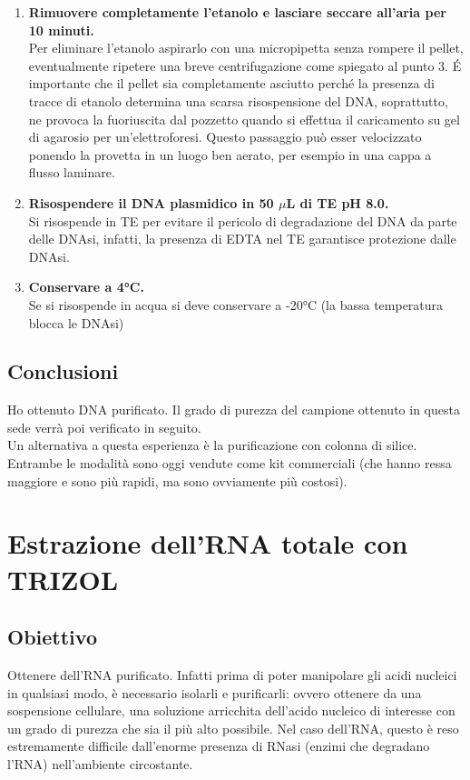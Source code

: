 \documentclass{extarticle}
\begin{document}
\begin{enumerate}
    \item \textbf{Rimuovere completamente l'etanolo e lasciare seccare all'aria per 10 minuti.}\\ Per eliminare l'etanolo aspirarlo con una micropipetta senza rompere il pellet, eventualmente ripetere una breve centrifugazione come spiegato al punto 3. É importante che il pellet sia completamente asciutto perché la presenza di tracce di etanolo determina una scarsa risospensione del DNA, soprattutto, ne provoca la fuoriuscita dal pozzetto quando si effettua il caricamento su gel di agarosio per un'elettroforesi. Questo passaggio può esser velocizzato ponendo la provetta in un luogo ben aerato, per esempio in una cappa a flusso laminare.
    \item \textbf{Risospendere il DNA plasmidico in 50  $\mu$L  di TE pH 8.0.}\\Si risospende in TE per evitare il pericolo di degradazione del DNA da parte delle DNAsi, infatti, la presenza di EDTA nel TE garantisce protezione dalle DNAsi.
    \item \textbf{Conservare a 4°C.}\\Se si risospende in acqua si deve conservare a -20°C (la bassa temperatura blocca le DNAsi)
\end{enumerate}
\subsection*{Conclusioni} Ho ottenuto DNA purificato. Il grado di purezza del campione ottenuto in questa sede verrà poi verificato in seguito.\\
Un alternativa a questa esperienza è la purificazione con colonna di silice. Entrambe le modalità sono oggi vendute come kit commerciali (che hanno ressa maggiore e sono più rapidi, ma sono ovviamente più costosi).
\newpage
\section{Estrazione dell'RNA totale con TRIZOL}
\subsection*{Obiettivo} Ottenere dell'RNA purificato. Infatti prima di poter manipolare gli acidi nucleici in qualsiasi modo, è necessario isolarli e purificarli: ovvero ottenere da una sospensione cellulare, una soluzione arricchita dell'acido nucleico di interesse con un grado di purezza che sia il più alto possibile. Nel caso dell'RNA, questo è reso estremamente difficile dall'enorme presenza di RNasi (enzimi che degradano l'RNA) nell'ambiente circostante.
\end{document}
